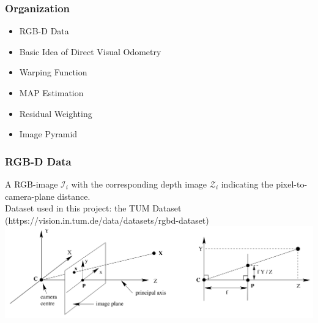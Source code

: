 
\begin{frame}
\frametitle{Organization}
\PraesentationSchriftgroesseGross
\begin{itemize}
    \item RGB-D Data
    \item Basic Idea of Direct Visual Odometry
    \item Warping Function
    \item MAP Estimation
    \item Residual Weighting
    \item Image Pyramid
\end{itemize}

\end{frame}
\clearpage

\begin{frame}
\frametitle{RGB-D Data}

A RGB-image $\mathcal{I}_i$ with the corresponding depth image $\mathcal{Z}_i$ indicating the pixel-to-camera-plane distance. \\

Dataset used in this project: the TUM Dataset (https://vision.in.tum.de/data/datasets/rgbd-dataset) \\[\baselineskip]

\includegraphics[width=\textwidth]{Bilder/depth.png}

\end{frame}
\clearpage

